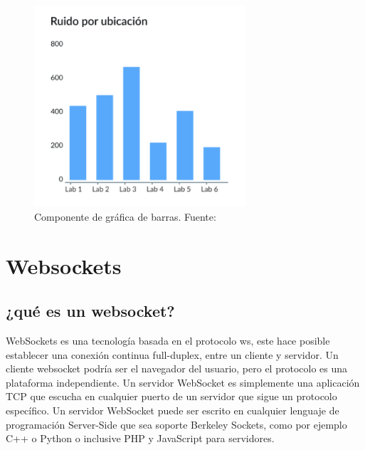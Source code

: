 {{\begin{itemize}
\begin{itemize}
            \begin{figure}[h]
              \centering
              \includegraphics[width=0.7\textwidth]{img/grafico_barras.png}
              \caption{Componente de gráfica de barras. Fuente: \cite{carpio2025}}
              \label{fig:your_label}
            \end{figure}
    
\end{itemize}

\section{Websockets}

\begin{itemize}

\subsection{¿qué es un websocket?}

WebSockets es una tecnología basada en el protocolo ws, este hace posible establecer una conexión continua full-duplex, entre un cliente y servidor. Un cliente websocket podría ser el navegador del usuario, pero el protocolo es una plataforma independiente. Un servidor WebSocket es simplemente una aplicación TCP que escucha en cualquier puerto de un servidor que sigue un protocolo específico. Un servidor WebSocket puede ser escrito en cualquier lenguaje de programación Server-Side que sea soporte Berkeley Sockets, como por ejemplo C++ o Python o inclusive PHP y JavaScript para servidores.

\end{itemize}


\end{itemize}}}
